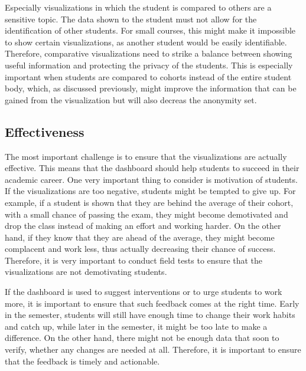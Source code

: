 Especially visualizations in which the student is compared to others are a sensitive topic. The data shown to the student must not allow for the identification of other students. For small courses, this might make it impossible to show certain visualizations, as another student would be easily identifiable.
Therefore, comparative visualizations need to strike a balance between showing useful information and protecting the privacy of the students. This is especially important when students are compared to cohorts instead of the entire student body, which, as discussed previously, might improve the information that can be gained from the visualization but will also decreas the anonymity set.

\subsection{Effectiveness}

The most important challenge is to ensure that the visualizations are actually effective. This means that the dashboard should help students to succeed in their academic career. One very important thing to consider is motivation of students.
If the visualizations are too negative, students might be tempted to give up. For example, if a student is shown that they are behind the average of their cohort, with a small chance of passing the exam, they might become demotivated and drop the class instead of making an effort and working harder.
On the other hand, if they know that they are ahead of the average, they might become complacent and work less, thus actually decreasing their chance of success.
Therefore, it is very important to conduct field tests to ensure that the visualizations are not demotivating students.

If the dashboard is used to suggest interventions or to urge students to work more, it is important to ensure that such feedback comes at the right time. Early in the semester, students will still have enough time to change their work habits and catch up, while later in the semester, it might be too late to make a difference.
On the other hand, there might not be enough data that soon to verify, whether any changes are needed at all.
Therefore, it is important to ensure that the feedback is timely and actionable.
